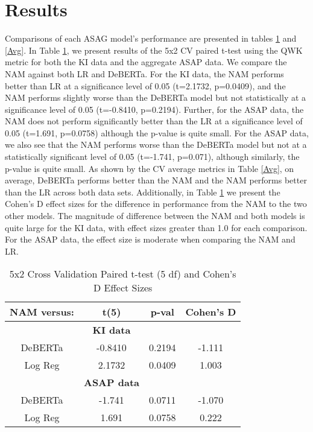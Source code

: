 \section{Results}
Comparisons of each ASAG model's performance are presented in tables \ref{CV} and \ref{Avg}. In Table \ref{CV}, we present results of the 5x2 CV paired t-test using the QWK metric for both the KI data and the aggregate ASAP data. We compare the NAM against both LR and DeBERTa. For the KI data, the NAM performs better than LR at a significance level of 0.05 (t=2.1732, p=0.0409), and the NAM performs slightly worse than the DeBERTa model but not statistically at a significance level of 0.05 (t=-0.8410, p=0.2194). Further, for the ASAP data, the NAM does not perform significantly better than the LR at a significance level of 0.05 (t=1.691, p=0.0758) although the p-value is quite small. For the ASAP data, we also see that the NAM performs worse than the DeBERTa model but not at a statistically significant level of 0.05 (t=-1.741, p=0.071), although similarly, the p-value is quite small. As shown by the CV average metrics in Table \ref{Avg}, on average, DeBERTa performs better than the NAM and the NAM performs better than the LR across both data sets. Additionally, in Table \ref{CV} we present the Cohen's D effect sizes for the difference in performance from the NAM to the two other models. The magnitude of difference between the NAM and both models is quite large for the KI data, with effect sizes greater than 1.0 for each comparison. For the ASAP data, the effect size is moderate when comparing the NAM and LR.

\begin{table}
\centering
  \caption{5x2 Cross Validation Paired t-test (5 df) and Cohen's D Effect Sizes}
  \label{CV}
  \begin{tabular}{cccc}
    \toprule
    NAM versus: & t(5) & p-val & Cohen's D \\
    \midrule
     & \textbf{KI data} & \\
    \midrule    
    DeBERTa & -0.8410 & 0.2194 &  -1.111 \\
    Log Reg & 2.1732 & 0.0409 &  1.003 \\
        \midrule
     & \textbf{ASAP data} & \\
    \midrule    
    DeBERTa & -1.741 & 0.0711 &  -1.070 \\
    Log Reg & 1.691 & 0.0758 &  0.222 \\
  \bottomrule
\end{tabular}
\end{table}

